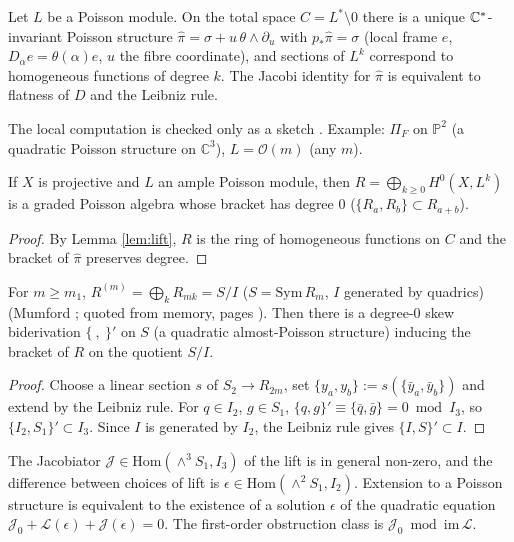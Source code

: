\begin{lem}\tP \tQ\label{lem:lift}
Let $L$ be a Poisson module. On the total space $C=L^*\setminus0$ there is a unique $\mathbb C^*$-invariant Poisson structure $\hat\pi=\sigma+u\,\theta\wedge\partial_u$ with $p_*\hat\pi=\sigma$ (local frame $e$, $D_\alpha e=\theta(\alpha)e$, $u$ the fibre coordinate), and sections of $L^k$ correspond to homogeneous functions of degree $k$. The Jacobi identity for $\hat\pi$ is equivalent to flatness of $D$ and the Leibniz rule.
\end{lem}
The local computation is checked only as a sketch \tQ. Example: $\Pi_F$ on $\mathbb P^2$ (a quadratic Poisson structure on $\mathbb C^3$), $L=\mathcal O(m)$ (any $m$).
\begin{prop}\tP\label{prop:graded}
If $X$ is projective and $L$ an ample Poisson module, then $R=\bigoplus_{k\ge0}H^0(X,L^k)$ is a graded Poisson algebra whose bracket has degree 0 ($\{R_a,R_b\}\subset R_{a+b}$).
\end{prop}
\begin{proof}
By Lemma \ref{lem:lift}, $R$ is the ring of homogeneous functions on $C$ and the bracket of $\hat\pi$ preserves degree. \qedhere
\end{proof}
\begin{prop}\tP \tC\label{prop:almost}
For $m\ge m_1$, $R^{(m)}=\bigoplus_kR_{mk}=S/I$ ($S=\mathrm{Sym}\,R_m$, $I$ generated by quadrics) (Mumford \cite{Mum}; quoted from memory, pages \tQ). Then there is a degree-0 skew biderivation $\{\ ,\ \}'$ on $S$ (a quadratic almost-Poisson structure) inducing the bracket of $R$ on the quotient $S/I$.
\end{prop}
\begin{proof}
Choose a linear section $s$ of $S_2\to R_{2m}$, set $\{y_a,y_b\}:=s(\{\bar y_a,\bar y_b\})$ and extend by the Leibniz rule. For $q\in I_2$, $g\in S_1$, $\{q,g\}'\equiv\{\bar q,\bar g\}=0\bmod I_3$, so $\{I_2,S_1\}'\subset I_3$. Since $I$ is generated by $I_2$, the Leibniz rule gives $\{I,S\}'\subset I$. \qedhere
\end{proof}
The Jacobiator $\mathcal J\in\mathrm{Hom}(\wedge^3S_1,I_3)$ of the lift is in general non-zero, and the difference between choices of lift is $\epsilon\in\mathrm{Hom}(\wedge^2S_1,I_2)$. Extension to a Poisson structure is equivalent to the existence of a solution $\epsilon$ of the quadratic equation $\mathcal J_0+\mathcal L(\epsilon)+\mathcal J(\epsilon)=0$. The first-order obstruction class is $\mathcal J_0\bmod\mathrm{im}\,\mathcal L$.


